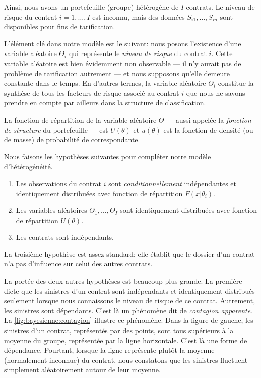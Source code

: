Ainsi, nous avons un portefeuille (groupe) hétérogène de $I$ contrats.
Le niveau de risque du contrat $i = 1, \dots, I$ est inconnu, mais des
données $S_{i1}, \dots, S_{in}$ sont disponibles pour fins de
tarification.

L'élément clé dans notre modèle est le suivant: nous posons
l'existence d'une variable aléatoire $\Theta_i$ qui représente le
\emph{niveau de risque} du contrat $i$. Cette variable aléatoire est
bien évidemment non observable --- il n'y aurait pas de problème de
tarification autrement --- et nous supposons qu'elle demeure constante
dans le temps. En d'autres termes, la variable aléatoire $\Theta_i$
constitue la synthèse de tous les facteurs de risque associé au contrat
$i$ que nous ne savons prendre en compte par ailleurs dans la
structure de classification.

La fonction de répartition de la variable aléatoire $\Theta$ --- aussi
appelée la \emph{fonction de structure} du portefeuille --- est
$U(\theta)$ et $u(\theta)$ est la fonction de densité (ou de masse) de
probabilité de correspondante.

Nous faisons les hypothèses suivantes pour compléter notre modèle
d'hétérogénéité.
\begin{enumerate}
\item Les observations du contrat $i$ sont \emph{conditionnellement}
  indépendantes et identiquement distribuées avec fonction de
  répartition $F(x|\theta_i)$.
\item Les variables aléatoires $\Theta_1, \dots, \Theta_I$ sont
  identiquement distribuées avec fonction de répartition $U(\theta)$.
\item Les contrats sont indépendants.
\end{enumerate}

La troisième hypothèse est assez standard: elle établit que le dossier
d'un contrat n'a pas d'influence sur celui des autres contrats.

La portée des deux autres hypothèses est beaucoup plus grande. La
première dicte que les sinistres d'un contrat sont indépendants et
identiquement distribués seulement lorsque nous connaissons le niveau
de risque de ce contrat. Autrement, les sinistres sont dépendants.
C'est là un phénomène dit de \emph{contagion apparente}. La
\autoref{fig:bayesienne:contagion} illustre ce phénomène. Dans la
figure de gauche, les sinistres d'un contrat, représentés par des
points, sont tous supérieurs à la moyenne du groupe, représentée par
la ligne horizontale. C'est là une forme de dépendance. Pourtant,
lorsque la ligne représente plutôt la moyenne (normalement inconnue)
du contrat, nous constatons que les sinistres fluctuent simplement
aléatoirement autour de leur moyenne.

